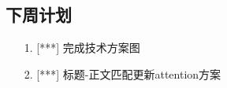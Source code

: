 \documentclass[11pt]{article}
\begin{document}
\begin{CJK}{UTF8}{gkai}
\section{下周计划}
\begin{itemize}
\item [1.] [***] 完成技术方案图
\item [2.] [***] 标题-正文匹配更新attention方案
\end{itemize}
%
%
%

\end{CJK}
\end{document}
